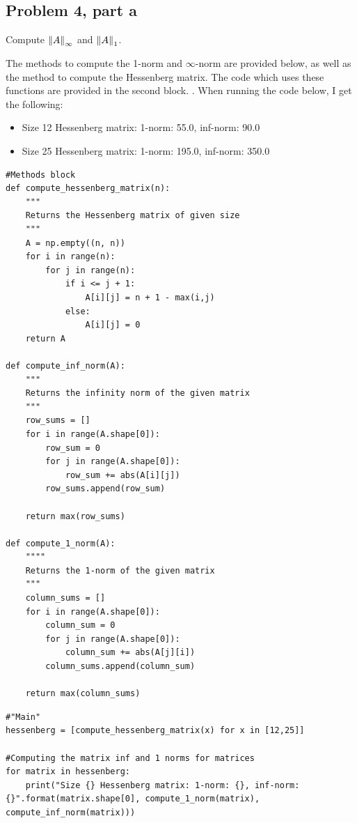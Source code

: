 \subsection{Problem 4, part a}
Compute $\norm{A}_\infty$ and $\norm{A}_1$.
\partbreak
\begin{solution}

    The methods to compute the 1-norm and $\infty$-norm are provided below, as well as the method to compute the Hessenberg matrix. The code which uses these functions are provided in the second block. . When running the code below, I get the following:
    \begin{itemize}
        \item Size 12 Hessenberg matrix: 1-norm: 55.0, inf-norm: 90.0
        \item Size 25 Hessenberg matrix: 1-norm: 195.0, inf-norm: 350.0
    \end{itemize}
    
\begin{lstlisting}
#Methods block
def compute_hessenberg_matrix(n):
    """
    Returns the Hessenberg matrix of given size
    """
    A = np.empty((n, n))
    for i in range(n):
        for j in range(n):
            if i <= j + 1:
                A[i][j] = n + 1 - max(i,j)
            else:
                A[i][j] = 0
    return A

def compute_inf_norm(A):
    """
    Returns the infinity norm of the given matrix 
    """
    row_sums = []
    for i in range(A.shape[0]):
        row_sum = 0
        for j in range(A.shape[0]):
            row_sum += abs(A[i][j])
        row_sums.append(row_sum)
    
    return max(row_sums)

def compute_1_norm(A):
    """"
    Returns the 1-norm of the given matrix
    """
    column_sums = []
    for i in range(A.shape[0]):
        column_sum = 0
        for j in range(A.shape[0]):
            column_sum += abs(A[j][i])
        column_sums.append(column_sum)
    
    return max(column_sums)

\end{lstlisting}
\begin{lstlisting}
#"Main"
hessenberg = [compute_hessenberg_matrix(x) for x in [12,25]]

#Computing the matrix inf and 1 norms for matrices
for matrix in hessenberg:
    print("Size {} Hessenberg matrix: 1-norm: {}, inf-norm: {}".format(matrix.shape[0], compute_1_norm(matrix), compute_inf_norm(matrix)))
\end{lstlisting}
\end{solution}

